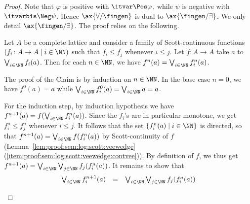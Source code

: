 \begin{proof}
Note that $\varphi$ is positive with $\itvar \Pos \varphi$,
while $\psi$ is negative with $\itvarbis \Neg \psi$.
Hence $\ax{\forall/\fingen}$ is dual to $\ax{\fingen/\exists}$.
We only detail $\ax{\fingen/\exists}$.
The proof relies on the following.

\begin{claim}
Let $A$ be a complete lattice and consider a family
of Scott-continuous functions $(f_i \colon A \to A \mid i \in \NN)$
such that $f_i \leq f_j$ whenever $i \leq j$.
Let $f \colon A \to A$ take $a$ to $\bigvee_{i \in \NN}f_i(a)$.
Then for each $n \in \NN$, we have $f^n(a) = \bigvee_{i \in \NN} f^n_i(a)$.
\end{claim}

\begin{claimproof}
%
The proof of the Claim is by induction on $n \in \NN$.
In the base case $n = 0$,
we have $f^0(a) = a$
while $\bigvee_{i\in \NN} f_i^0(a) = \bigvee_{i \in \NN} a = a$.

For the induction step, by induction hypothesis we have
$f^{n+1}(a) = f(\bigvee_{i \in \NN} f_i^n(a))$.
Since the $f_i$'s are in particular monotone,
we get $f^n_i \leq f^n_j$ whenever $i \leq j$.
It follows that the set $\{f^n_i(a) \mid i \in \NN \}$ is directed,
so that
$f^{n+1}(a) = \bigvee_{i \in \NN} f(f^n_i(a))$
by Scott-continuity of $f$
(Lemma~\ref{lem:proof:sem:log:scott:veewedge}%
(\ref{item:proof:sem:log:scott:veewedge:contvee})).
%
By definition of $f$, we thus get
$f^{n+1}(a) = \bigvee_{i \in \NN} \bigvee_{j \in \NN} f_j(f_i^n(a))$.
It remains to show that
\[
\begin{array}{l l l}
  \bigvee_{i \in \NN} f_i^{n+1}(a)
& =
& \bigvee_{i \in \NN}\bigvee_{j \in \NN} f_j(f_i^n(a))
\end{array}
\]


\end{claimproof}
\end{proof}
